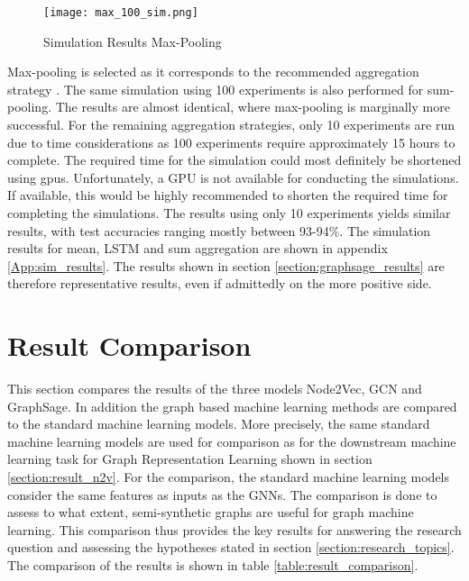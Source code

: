   \begin{figure}[htbp!]
		\centering
		\texttt{[image: max\_100\_sim.png]}
		\caption{Simulation Results Max-Pooling}
        \label{fig:simulation_results}
  \end{figure}

  \noindent Max-pooling is selected as it corresponds to the recommended
  aggregation strategy \citep[p. 9]{hamilton2017inductive}. The same simulation
  using 100 experiments is also performed for sum-pooling. The results are
  almost identical, where max-pooling is marginally more successful. For the 
  remaining aggregation strategies, only 10 experiments are run due to time
  considerations as 100 experiments require approximately 15 hours to complete.
  The required time for the simulation could most definitely be shortened using
  \acp{gpu}. Unfortunately, a GPU is not available for conducting the simulations. 
  If available, this would be highly recommended to shorten the required time for 
  completing the simulations. The results using only 10 experiments yields similar 
  results, with test accuracies ranging mostly between 93-94\%. The simulation 
  results for mean, LSTM and sum aggregation are shown in appendix \ref{App:sim_results}. 
  The results shown in section \ref{section:graphsage_results} are therefore 
  representative results, even if admittedly on the more positive side. 

  \newpage
  \section{Result Comparison}
  \label{section:result_comp}

  This section compares the results of the three models Node2Vec, GCN and
  GraphSage. In addition the graph based machine learning methods are compared
  to the standard machine learning models. More precisely, the same standard
  machine learning models are used for comparison as for the downstream 
  machine learning task for Graph Representation Learning shown in section 
  \ref{section:result_n2v}. For the comparison, the standard machine learning 
  models consider the same features as inputs as the GNNs. The comparison is 
  done to assess to what extent, semi-synthetic graphs are useful for graph 
  machine learning. This comparison thus provides the key results for answering
  the research question and assessing the hypotheses stated in section 
  \ref{section:research_topics}. The comparison of the results is shown in table 
  \ref{table:result_comparison}.


